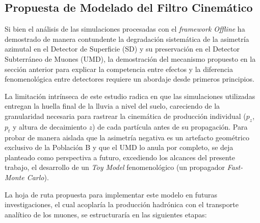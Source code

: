 \iffalse
\subsection{Propuesta de Modelado del Filtro Cinemático}
\label{subsec:fast_mc}

Si bien el análisis de las simulaciones procesadas con el \textit{framework Offline} ha demostrado de manera contundente la degradación sistemática de la asimetría azimutal en el Detector de Superficie (SD) y su preservación en el Detector Subterráneo de Muones (UMD), la demostración del mecanismo propuesto en la sección anterior para explicar la competencia entre efectos y la diferencia fenomenológica entre detectores requiere un abordaje desde primeros principios. 

La limitación intrínseca de este estudio radica en que las simulaciones utilizadas entregan la huella final de la lluvia a nivel del suelo, careciendo de la granularidad necesaria para rastrear la cinemática de producción individual ($p_z$, $p_t$ y altura de decaimiento $z$) de cada partícula antes de su propagación. Para probar de manera aislada que la asimetría negativa es un artefacto geométrico exclusivo de la Población B y que el UMD lo anula por completo, se deja planteado como perspectiva a futuro, excediendo los alcances del presente trabajo, el desarrollo de un \textit{Toy Model} fenomenológico (un propagador \textit{Fast-Monte Carlo}).

La hoja de ruta propuesta para implementar este modelo en futuras investigaciones, el cual acoplaría la producción hadrónica con el transporte analítico de los muones, se estructuraría en las siguientes etapas:

